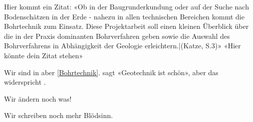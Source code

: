 Hier kommt ein Zitat: «Ob in der Baugrunderkundung oder auf der Suche nach Bodenschätzen in der Erde - nahezu in allen technischen Bereichen kommt die Bohrtechnik zum Einsatz. Diese Projektarbeit soll einen kleinen Überblick über die in der Praxis dominanten Bohrverfahren geben sowie die Auswahl des Bohrverfahrens in Abhängigkeit der Geologie erleichtern.|(Katze, S.3)» «Hier könnte dein Zitat stehen» 

Wir sind in  aber \cref{Bohrtechnik}. \textcite{ziegler2012geotechnische} sagt «Geotechnik ist schön», aber das widerspricht \cite{ziegler2012geotechnische}.

Wir ändern noch was!

Wir schreiben noch mehr Blödsinn.

